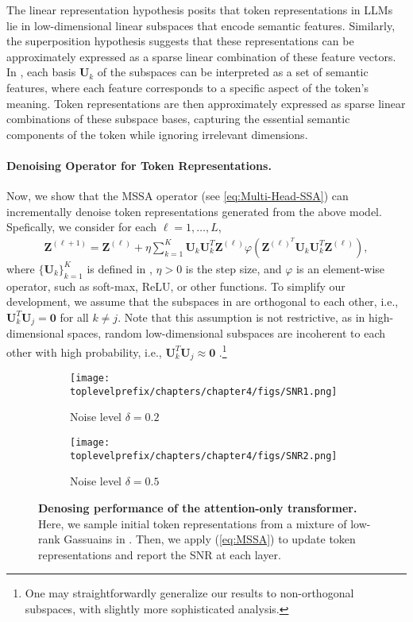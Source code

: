 \documentclass[../../book-main.tex]{subfiles}
\begin{document}
\begin{remark}
    The linear representation hypothesis posits that token representations in LLMs lie in low-dimensional linear subspaces that encode semantic features. Similarly, the superposition hypothesis suggests that these representations can be approximately expressed as a sparse linear combination of these feature vectors. In , each basis $\bm U_k$ of the subspaces can be interpreted as a set of semantic features, where each feature corresponds to a specific aspect of the token's meaning. Token representations are then approximately expressed as sparse linear combinations of these subspace bases, capturing the essential semantic components of the token while ignoring irrelevant dimensions. 
\end{remark}

\paragraph{Denoising Operator for Token Representations.} Now, we show that the MSSA operator (see \eqref{eq:Multi-Head-SSA}) can incrementally denoise token representations generated from the above model. Spefically, we consider for each $\ell =1 ,\dots,L$, 
\begin{align}\label{eq:MSSA}
    \bm Z^{(\ell+1)} =  \bm Z^{(\ell)} + \eta \sum_{k=1}^K \bm U_k\bm U_k^T \bm Z^{(\ell)} \varphi \left(\bm Z^{(\ell)^T}\bm U_k\bm U_k^T\bm Z^{(\ell)} \right),
\end{align}
where $\{\bm U_k\}_{k=1}^K$ is defined in , $\eta > 0$ is the step size, and $\varphi$ is an element-wise operator, such as soft-max, ReLU, or other functions. To simplify our development, we assume that the subspaces in  are orthogonal to each other, i.e., $\bm U_k^T\bm U_j = \bm 0$ for all $k \neq j$. Note that this assumption is not restrictive, as in high-dimensional spaces, random low-dimensional subspaces are incoherent to each other with high probability, i.e., $\bm U_k^T\bm U_j \approx \bm 0$ \citep{Wright-Ma-2021}.\footnote{One may straightforwardly generalize our results to non-orthogonal subspaces, with slightly more sophisticated analysis.}   

\begin{figure}[t]
    \begin{subfigure}[t]{0.45\textwidth}
        \centering
        \texttt{[image: \\toplevelprefix/chapters/chapter4/figs/SNR1.png]}
        \caption{Noise level $\delta = 0.2$}
    \end{subfigure}
    \hfill
    \begin{subfigure}[t]{0.45\textwidth}
        \centering
        \texttt{[image: \\toplevelprefix/chapters/chapter4/figs/SNR2.png]}
        \caption{Noise level $\delta = 0.5$}
    \end{subfigure}
    \caption{{\bf Denosing performance of the attention-only transformer.} Here, we sample initial token representations from a mixture of low-rank Gassuains in . Then, we apply (\ref{eq:MSSA}) to update token representations and report the SNR at each layer.}  \label{fig:MSSA} 
\end{figure} 
\end{document}
